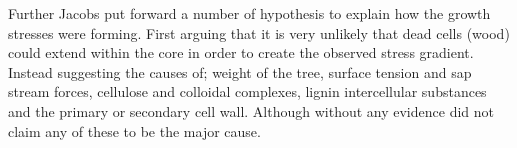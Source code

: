 Further Jacobs put forward a number of hypothesis to explain how the growth
stresses were forming. First arguing that it is very unlikely that dead cells
(wood) could extend within the core in order to create the observed stress
gradient. Instead suggesting the causes of; weight of the tree, surface tension
and sap stream forces, cellulose and colloidal complexes, lignin intercellular
substances and the primary or secondary cell wall. Although without any evidence
did not claim any of these to be the major cause.
